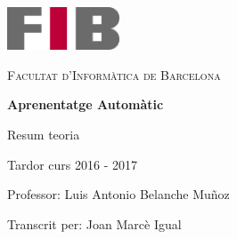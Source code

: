 \documentclass[a4paper]{report}
\begin{document}
\begin{titlepage}
	\centering
	\vspace{1cm}
	\includegraphics[width=0.25\textwidth]{images/logoFIB}
	\par\vspace{1cm}
	\textsc{ \LARGE Facultat d'Informàtica de Barcelona}
	\par\vspace{2cm}
	\textbf{\Huge Aprenentatge Automàtic}
	\par\vspace{2cm}
	{\LARGE Resum teoria}
	\par\vspace{1em}
	{\Large Tardor curs 2016 - 2017}
	\vfill
	\begin{flushright}
		\large
		Professor: Luis Antonio Belanche Muñoz \par
		Transcrit per: Joan Marcè Igual
	\end{flushright}
\end{titlepage}

\setlength{\parskip}{0.6em}
\tableofcontents
\pagebreak

\setlength{\parindent}{0pt}
\setlength{\parskip}{1em}










\end{document}
